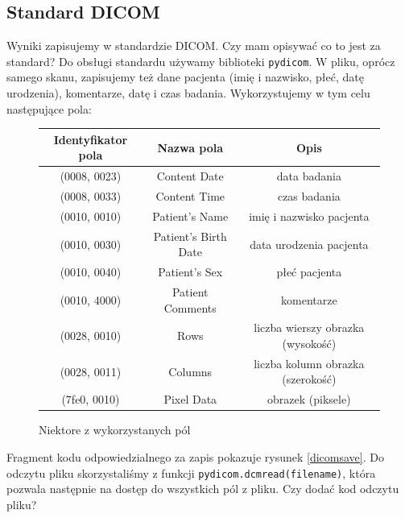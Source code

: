 \documentclass[polish,polish,a4paper]{article}
\begin{document}
			\subsection{Standard DICOM}
			Wyniki zapisujemy w standardzie DICOM. 
			{\color{red} Czy mam opisywać co to jest za standard?}
			Do obsługi standardu używamy biblioteki \texttt{pydicom}. W pliku, oprócz samego skanu, zapisujemy też dane pacjenta (imię i nazwisko, płeć, datę urodzenia), komentarze, datę i czas badania. Wykorzystujemy w tym celu następujące pola:
			\begin{figure}[!h]
				\centering
				\begin{tabular}{|c|c|c|}
				\hline
				\textbf{Identyfikator pola} & \textbf{Nazwa pola} & \textbf{Opis} \\
				\hline \hline
				(0008, 0023) & Content Date & data badania \\
				\hline
				(0008, 0033) & Content Time & czas badania \\
				\hline
				(0010, 0010) & Patient's Name & imię i nazwisko pacjenta \\
				\hline
				(0010, 0030) & Patient's Birth Date & data urodzenia pacjenta \\
				\hline
				(0010, 0040) & Patient's Sex & płeć pacjenta \\
				\hline
				(0010, 4000) & Patient Comments & komentarze \\
				\hline
				(0028, 0010) & Rows & liczba wierszy obrazka (wysokość) \\
				\hline
				(0028, 0011) & Columns & liczba kolumn obrazka (szerokość) \\
				\hline
				(7fe0, 0010) & Pixel Data & obrazek (piksele) \\
				\hline
				\end{tabular}
				\caption{Niektore z wykorzystanych pól}
			\end{figure}
			\newpage
			Fragment kodu odpowiedzialnego za zapis pokazuje rysunek \ref{dicomsave}. Do odczytu pliku skorzystaliśmy z funkcji \texttt{pydicom.dcmread(filename)}, która pozwala następnie na dostęp do wszystkich pól z pliku.
			{\color{red} Czy dodać kod odczytu pliku?}
			
\end{document}

